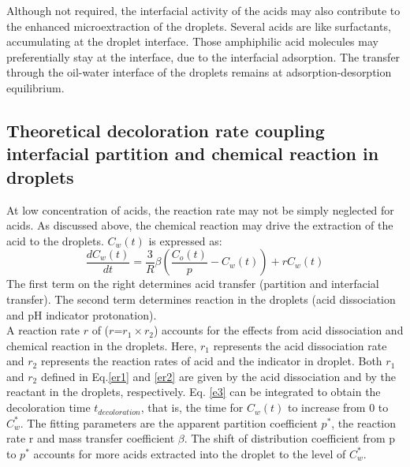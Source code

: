 \documentclass[journal=langd5,manuscript=article]{achemso}
\begin{document}
Although not required, the interfacial activity of the acids may also contribute to the enhanced microextraction of the droplets. Several acids are like surfactants, accumulating at the droplet interface. Those amphiphilic acid molecules may preferentially stay at the interface, due to the interfacial adsorption. The transfer through the oil-water interface of the droplets remains at adsorption-desorption equilibrium.

\subsection{Theoretical decoloration rate coupling interfacial partition and chemical reaction in droplets}
At low concentration of acids, the reaction rate may not be simply neglected for acids. As discussed above, the chemical reaction may drive the extraction of the acid to the droplets. 
$C_w(t)$ is expressed as:
\begin{equation}
\frac{dC_w(t)}{dt}=\frac{3}{R}\beta(\frac{C_o(t)}{p}-C_w(t))+rC_w(t)
\label{e3}
\end{equation}
The first term on the right determines acid transfer (partition and interfacial transfer). The second term determines reaction in the droplets (acid dissociation and pH indicator protonation).\\
A reaction rate $r$ of ($r$=$r_1 \times r_2$) accounts for the effects from acid dissociation and chemical reaction in the droplets. Here, $r_1$ represents the acid dissociation rate and $r_2$ represents the reaction rates of acid and the indicator in droplet. Both $r_1$ and $r_2$ defined in Eq.\ref{er1} and \ref{er2} are given by the acid dissociation and by the reactant in the droplets, respectively. Eq. \ref{e3} can be integrated to obtain the decoloration time $t_{decoloration}$, that is, the time for $C_w(t)$ to increase from 0 to $C_w^*$. The fitting parameters are the apparent partition coefficient $p^*$, the reaction rate r and mass transfer coefficient $\beta$. The shift of distribution coefficient from p to $p^*$ accounts for more acids extracted into the droplet to the level of $C^*_w$. \\
\end{document}
